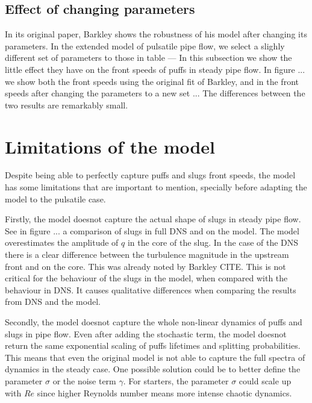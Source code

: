 \documentclass{article}
\begin{document}
\subsection{Effect of changing parameters}
In its original paper, Barkley shows the robustness of his model after changing its parameters. In the extended model of pulsatile pipe flow, we select a slighly different set of parameters to those in table --- In this subsection we show the little effect they have on the front speeds of puffs in steady pipe flow. In figure ... we show both the front speeds using the original fit of Barkley, and in the front speeds after changing the parameters to a new set ... The differences between the two results are remarkably small.



\section{Limitations of the model}
Despite being able to perfectly capture puffs and slugs front speeds, the model has some limitations that are important to mention, specially before adapting the model to the pulsatile case.

Firstly, the model doesnot capture the actual shape of slugs in steady pipe flow. See in figure ... a comparison of slugs in full DNS and on the model. The model overestimates the amplitude of $q$ in the core of the slug. In the case of the DNS there is a clear difference between the turbulence magnitude in the upstream front and on the core. This was already noted by Barkley CITE. This is not critical for the behaviour of the slugs in the model, when compared with the behaviour in DNS. It causes qualitative differences when comparing the results from DNS and the model. 

Secondly, the model doesnot capture the whole non-linear dynamics of puffs and slugs in pipe flow. Even after adding the stochastic term, the model doesnot return the same exponential scaling of puffs lifetimes and splitting probabilities. This means that even the original model is not able to capture the full spectra of dynamics in the steady case. One possible solution could be to better define the parameter $\sigma$ or the noise term $\gamma$. For starters, the parameter $\sigma$ could scale up with $Re$ since higher Reynolds number means more intense chaotic dynamics.







\end{document}
